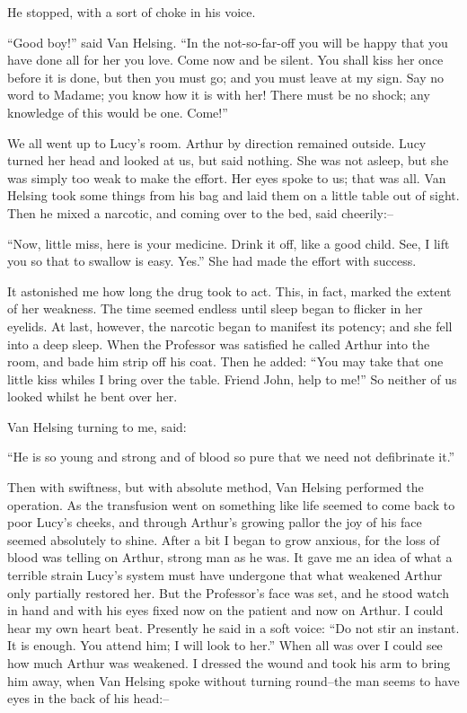 \documentclass[12pt,openright]{book}
\begin{document}
He stopped, with a sort of choke in his voice.

“Good boy!” said Van Helsing. “In the not-so-far-off you will be happy that you have done all for her you love. Come now and be silent. You shall kiss her once before it is done, but then you must go; and you must leave at my sign. Say no word to Madame; you know how it is with her! There must be no shock; any knowledge of this would be one. Come!”

We all went up to Lucy’s room. Arthur by direction remained outside. Lucy turned her head and looked at us, but said nothing. She was not asleep, but she was simply too weak to make the effort. Her eyes spoke to us; that was all. Van Helsing took some things from his bag and laid them on a little table out of sight. Then he mixed a narcotic, and coming over to the bed, said cheerily:–

“Now, little miss, here is your medicine. Drink it off, like a good child. See, I lift you so that to swallow is easy. Yes.” She had made the effort with success.

It astonished me how long the drug took to act. This, in fact, marked the extent of her weakness. The time seemed endless until sleep began to flicker in her eyelids. At last, however, the narcotic began to manifest its potency; and she fell into a deep sleep. When the Professor was satisfied he called Arthur into the room, and bade him strip off his coat. Then he added: “You may take that one little kiss whiles I bring over the table. Friend John, help to me!” So neither of us looked whilst he bent over her.

Van Helsing turning to me, said:

“He is so young and strong and of blood so pure that we need not defibrinate it.”

Then with swiftness, but with absolute method, Van Helsing performed the operation. As the transfusion went on something like life seemed to come back to poor Lucy’s cheeks, and through Arthur’s growing pallor the joy of his face seemed absolutely to shine. After a bit I began to grow anxious, for the loss of blood was telling on Arthur, strong man as he was. It gave me an idea of what a terrible strain Lucy’s system must have undergone that what weakened Arthur only partially restored her. But the Professor’s face was set, and he stood watch in hand and with his eyes fixed now on the patient and now on Arthur. I could hear my own heart beat. Presently he said in a soft voice: “Do not stir an instant. It is enough. You attend him; I will look to her.” When all was over I could see how much Arthur was weakened. I dressed the wound and took his arm to bring him away, when Van Helsing spoke without turning round–the man seems to have eyes in the back of his head:–
\end{document}
